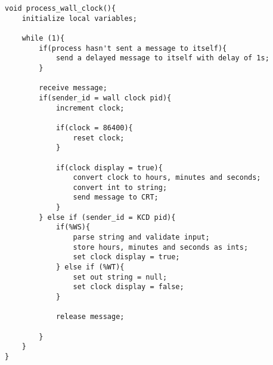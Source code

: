 \documentclass[oneside]{article}
\begin{document}
\begin{lstlisting}
void process_wall_clock(){
    initialize local variables;

    while (1){
        if(process hasn't sent a message to itself){
            send a delayed message to itself with delay of 1s;
        }
        
        receive message;
        if(sender_id = wall clock pid){
            increment clock;

            if(clock = 86400){
                reset clock;
            }
            
            if(clock display = true){
                convert clock to hours, minutes and seconds;
                convert int to string;
                send message to CRT;
            }
        } else if (sender_id = KCD pid){
            if(%WS){
                parse string and validate input;
                store hours, minutes and seconds as ints;
                set clock display = true;
            } else if (%WT){
                set out string = null;
                set clock display = false;
            }
            
            release message;        

        }
    }
}
\end{lstlisting}
\end{document}
